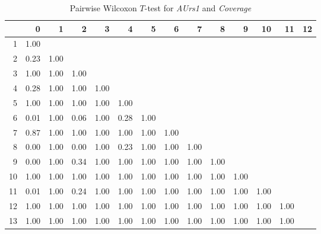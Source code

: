 \begin{table}[ht]
	\small
	\centering
	\begin{tabular}{rrrrrrrrrrrrrr}
		\hline
	   & 0 & 1 & 2 & 3 & 4 & 5 & 6 & 7 & 8 & 9 & 10 & 11 & 12 \\ 
		\hline
	  1 & 1.00 &  &  &  &  &  &  &  &  &  &  &  &  \\ 
		2 & 0.23 & 1.00 &  &  &  &  &  &  &  &  &  &  &  \\ 
		3 & 1.00 & 1.00 & 1.00 &  &  &  &  &  &  &  &  &  &  \\ 
		4 & 0.28 & 1.00 & 1.00 & 1.00 &  &  &  &  &  &  &  &  &  \\ 
		5 & 1.00 & 1.00 & 1.00 & 1.00 & 1.00 &  &  &  &  &  &  &  &  \\ 
		6 & 0.01 & 1.00 & 0.06 & 1.00 & 0.28 & 1.00 &  &  &  &  &  &  &  \\ 
		7 & 0.87 & 1.00 & 1.00 & 1.00 & 1.00 & 1.00 & 1.00 &  &  &  &  &  &  \\ 
		8 & 0.00 & 1.00 & 0.00 & 1.00 & 0.23 & 1.00 & 1.00 & 1.00 &  &  &  &  &  \\ 
		9 & 0.00 & 1.00 & 0.34 & 1.00 & 1.00 & 1.00 & 1.00 & 1.00 & 1.00 &  &  &  &  \\ 
		10 & 1.00 & 1.00 & 1.00 & 1.00 & 1.00 & 1.00 & 1.00 & 1.00 & 1.00 & 1.00 &  &  &  \\ 
		11 & 0.01 & 1.00 & 0.24 & 1.00 & 1.00 & 1.00 & 1.00 & 1.00 & 1.00 & 1.00 & 1.00 &  &  \\ 
		12 & 1.00 & 1.00 & 1.00 & 1.00 & 1.00 & 1.00 & 1.00 & 1.00 & 1.00 & 1.00 & 1.00 & 1.00 &  \\ 
		13 & 1.00 & 1.00 & 1.00 & 1.00 & 1.00 & 1.00 & 1.00 & 1.00 & 1.00 & 1.00 & 1.00 & 1.00 &  \\ 
		 \hline
	  \end{tabular}
    \caption{Pairwise Wilcoxon $T$-test for \textit{AUrs1} and \textit{Coverage}}
    \label{tbl:wilcoxon_baysis_initiator_AUrs1_Cov}
\end{table}

